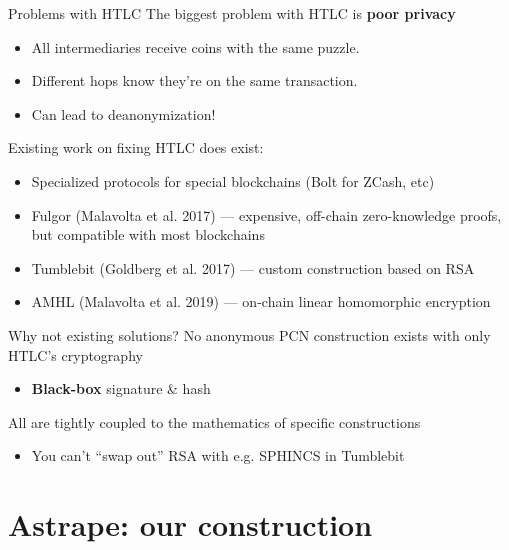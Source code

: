 \documentclass[aspectratio=169]{beamer}
\begin{document}
\begin{frame}{Problems with HTLC}
    The biggest problem with HTLC is \textbf{poor privacy}
    \begin{itemize}
        \item All intermediaries receive coins with the same puzzle.
        \item Different hops know they're on the same transaction.
        \item Can lead to deanonymization!
    \end{itemize}

    Existing work on fixing HTLC does exist:
    \begin{itemize}
        \item Specialized protocols for special blockchains (Bolt for ZCash, etc)
        \item Fulgor (Malavolta et al. 2017) --- expensive, off-chain zero-knowledge proofs, but compatible with most blockchains
        \item Tumblebit (Goldberg et al. 2017) --- custom construction based on RSA
        \item AMHL (Malavolta et al. 2019) --- on-chain linear homomorphic encryption
    \end{itemize}
\end{frame}

\begin{frame}{Why not existing solutions?}
    No anonymous PCN construction exists with only HTLC's cryptography
    \begin{itemize}
        \item \textbf{Black-box} signature \& hash
    \end{itemize}

    All are tightly coupled to the mathematics of specific constructions
    \begin{itemize}
        \item You can't ``swap out'' RSA with e.g. SPHINCS in Tumblebit
    \end{itemize}
\end{frame}


\section{Astrape: our construction}
\end{document}
